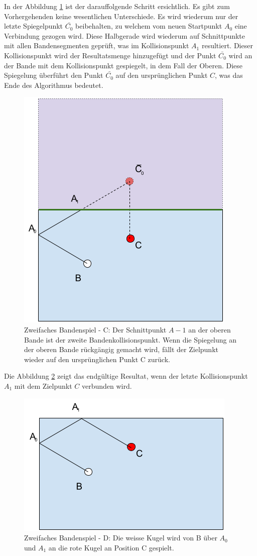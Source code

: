 In der Abbildung \ref{fig:zweifaches_bandenspiel_c} ist der darauffolgende Schritt ersichtlich.
Es gibt zum Vorhergehenden keine wesentlichen Unterschiede.
Es wird wiederum nur der letzte Spiegelpunkt $\bar{C_0}$ beibehalten, zu welchem vom
neuen Startpunkt $A_0$ eine Verbindung gezogen wird.
Diese Halbgerade wird wiederum auf Schnittpunkte mit allen Bandensegmenten geprüft, was im Kollisionspunkt $A_1$ resultiert.
Dieser Kollisionspunkt wird der Resultatsmenge hinzugefügt und der Punkt $\bar{C_0}$
wird an der Bande mit dem Kollisionspunkt gespiegelt, in dem Fall der Oberen.
Diese Spiegelung überführt den Punkt $\bar{C_0}$ auf den ursprünglichen Punkt $C$, was das Ende des Algorithmus
bedeutet.
\begin{figure}[h]
    \begin{center}
        \includegraphics[width=0.5\linewidth]{../common/03_billiard_ai/resources/52_rail_reflection_2_c.png}
    \end{center}
    \caption{Zweifaches Bandenspiel - C: Der Schnittpunkt $A-1$ an der oberen Bande ist der zweite Bandenkollisionspunkt.
    Wenn die Spiegelung an der oberen Bande rückgängig gemacht wird, fällt der Zielpunkt wieder auf den ursprünglichen Punkt C zurück.}
    \label{fig:zweifaches_bandenspiel_c}
\end{figure}

Die Abbildung \ref{fig:zweifaches_bandenspiel_d} zeigt das endgültige Resultat, wenn der letzte Kollisionspunkt $A_1$
mit dem Zielpunkt $C$ verbunden wird.

\begin{figure}[h!]
    \begin{center}
        \includegraphics[width=0.5\linewidth]{../common/03_billiard_ai/resources/53_rail_reflection_2_d.png}
    \end{center}
    \caption{Zweifaches Bandenspiel - D: Die weisse Kugel wird von B über $A_0$ und $A_1$ an die rote Kugel an Position C gespielt.}
    \label{fig:zweifaches_bandenspiel_d}
\end{figure}

